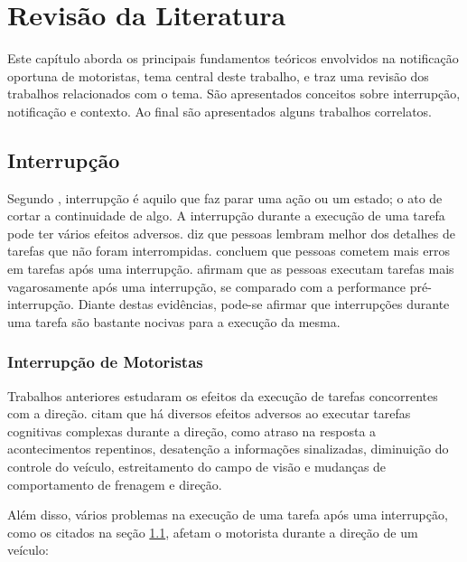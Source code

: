 
\chapter{Revisão da Literatura}
\label{revisao-lit}
Este capítulo aborda os principais fundamentos teóricos envolvidos na notificação oportuna de motoristas,
tema central deste trabalho, e traz uma revisão dos trabalhos relacionados com o tema. São apresentados
conceitos sobre interrupção, notificação e contexto. Ao final são apresentados alguns trabalhos correlatos.

\section{Interrupção}
\label{interrupcao}

Segundo , interrupção é aquilo que faz parar uma ação ou um estado; o ato de cortar a continuidade de
algo. A interrupção durante a execução de uma tarefa pode ter vários efeitos adversos.  diz
que pessoas lembram melhor dos detalhes de tarefas que não foram interrompidas.  concluem que
pessoas cometem mais erros em tarefas após uma interrupção.  afirmam que as pessoas executam tarefas
mais vagarosamente após uma interrupção, se comparado com a performance pré-interrupção. Diante destas evidências, pode-se
afirmar que interrupções durante uma tarefa são bastante nocivas para a execução da mesma.

\subsection{Interrupção de Motoristas}
\label{interrupcao-motoristas}

Trabalhos anteriores estudaram os efeitos da execução de tarefas concorrentes com a direção.  citam
que há diversos efeitos adversos ao executar tarefas cognitivas complexas durante a direção, como atraso na resposta a
acontecimentos repentinos, desatenção a informações sinalizadas, diminuição do controle do veículo, estreitamento do campo
de visão e mudanças de comportamento de frenagem e direção.

Além disso, vários problemas na execução de uma tarefa após uma interrupção, como os citados na seção \ref{interrupcao}, afetam o
motorista durante a direção de um veículo:

